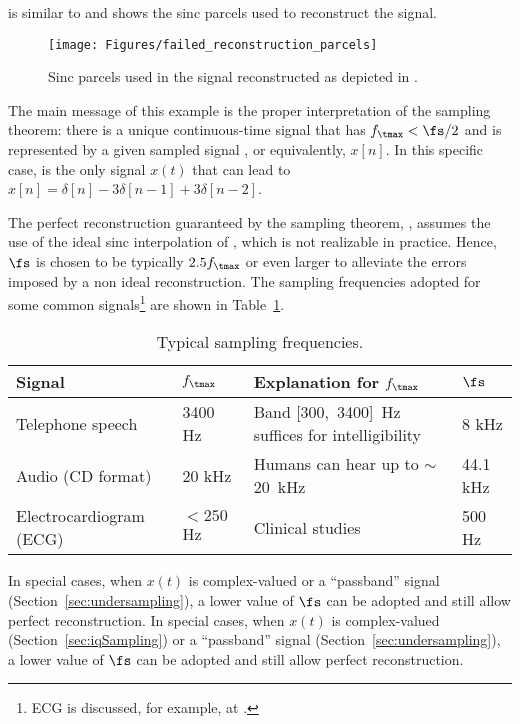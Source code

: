  is similar to  and shows the
sinc parcels used to reconstruct the signal.
\begin{figure}
	\centering
		\texttt{[image: Figures/failed\_reconstruction\_parcels]}		
	\caption{Sinc parcels used in the signal reconstructed as depicted in .\label{fig:failed_reconstruction_parcels}}
\end{figure}

The main message of this example is the proper interpretation of
the sampling theorem: there is a unique continuous-time signal that has $f_\tmax < \fs/2$ and is represented
by a given sampled signal \xs, or equivalently, $x[n]$. 
In this specific case,  is the only signal $x(t)$ that can lead to
$x[n]=\delta[n]-3\delta[n-1]+3\delta[n-2]$.
\eExample

The perfect reconstruction guaranteed by the sampling theorem, , assumes the use of the ideal sinc interpolation of , which is not realizable in practice. Hence, $\fs$ is chosen to be typically $2.5 f_\tmax$ or even larger to alleviate the errors imposed by a non ideal reconstruction. The sampling frequencies adopted for some common signals\footnote{ECG is discussed, for example, at .} are shown in Table~\ref{tab:samplingfreqs}.

\begin{table}
   \centering
   \caption{Typical sampling frequencies.\label{tab:samplingfreqs}}	
\begin{tabularx}{\textwidth}{llXl}
\toprule
  Signal & $f_\tmax$ & Explanation for $f_\tmax$ & $\fs$ \\
  \midrule
	Telephone speech & 3400 Hz & Band [300,~3400]~Hz suffices for intelligibility & 8 kHz \\
	Audio (CD format) & 20 kHz & Humans can hear up to $\sim$20~kHz & 44.1 kHz \\
	Electrocardiogram (ECG) & $<250$ Hz &  Clinical studies & 500 Hz \\
	\bottomrule
	\end{tabularx}
\end{table}

\ifml
In special cases, when $x(t)$ is complex-valued or a ``passband'' signal (Section~\ref{sec:undersampling}), a lower value of $\fs$ can be adopted and still allow perfect reconstruction.
\else
In special cases, when $x(t)$ is complex-valued (Section~\ref{sec:iqSampling}) or a ``passband'' signal (Section~\ref{sec:undersampling}), a lower value of $\fs$ can be adopted and still allow perfect reconstruction.
\fi

